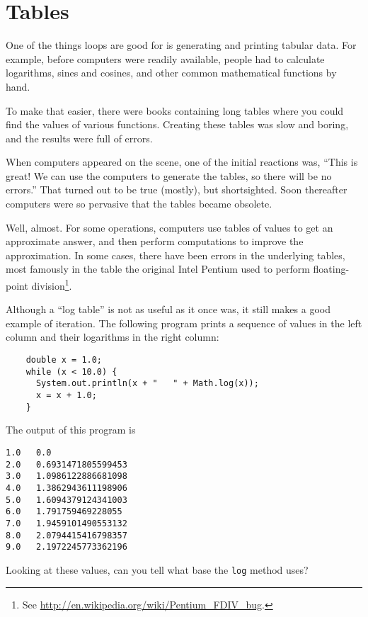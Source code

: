 \documentclass[12pt]{book}
\theoremstyle{definition}
\begin{document}
\section{Tables}

One of the things loops are good for is generating and printing
tabular data.  For example, before computers were readily
available, people had to calculate logarithms,
sines and cosines, and other common mathematical functions
by hand.

To make that easier, there were books containing long tables
where you could find the values of various functions.
Creating these tables was slow and boring, and the results
were full of errors.

When computers appeared on the scene, one of the initial reactions
was, ``This is great!  We can use the computers to generate the
tables, so there will be no errors.''  That turned out to be true
(mostly), but shortsighted.  Soon thereafter computers were so
pervasive that the tables became obsolete.

Well, almost.  For some operations, computers use tables of values to
get an approximate answer, and then perform computations to improve
the approximation.  In some cases, there have been errors in the
underlying tables, most famously in the table the original Intel
Pentium used to perform floating-point division\footnote{See
  \url{http://en.wikipedia.org/wiki/Pentium_FDIV_bug}.}.


Although a ``log table'' is not as useful as it once was, it still
makes a good example of iteration.  The following program prints a
sequence of values in the left column and their logarithms in the
right column:

\begin{lstlisting}
    double x = 1.0;
    while (x < 10.0) {
      System.out.println(x + "   " + Math.log(x));
      x = x + 1.0;
    }
\end{lstlisting}
%
The output of this program is

\begin{lstlisting}
1.0   0.0
2.0   0.6931471805599453
3.0   1.0986122886681098
4.0   1.3862943611198906
5.0   1.6094379124341003
6.0   1.791759469228055
7.0   1.9459101490553132
8.0   2.0794415416798357
9.0   2.1972245773362196
\end{lstlisting}
%
Looking at these values, can you tell what base the {\tt log}
method uses?
\end{document}
